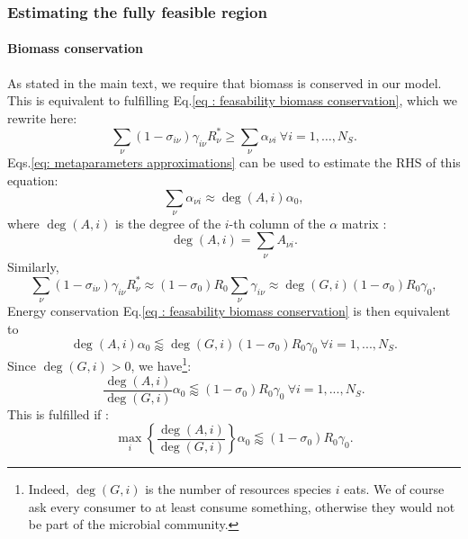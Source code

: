 \documentclass[12pt, titlepage, twoside, openright]{report}
\begin{document}
\subsubsection{Estimating the fully feasible region}\label{sec : estimating fully feasible region metaparameters}
\paragraph{Biomass conservation}
As stated in the main text, we require that biomass is conserved in our model. This is equivalent to fulfilling Eq.\eqref{eq : feasability biomass conservation}, which we rewrite here:
\begin{equation}
\sum_\nu \left(1-\sigma_{i\nu}\right)\gamma_{i\nu}R^*_\nu \geq \sum_\nu \alpha_{\nu i} \ \forall i=1,\dots, N_S.
\end{equation}
Eqs.\eqref{eq: metaparameters approximations} can be used to estimate the RHS of this equation:
\begin{equation}
\sum_\nu \alpha_{\nu i} \approx \deg(A, i) \alpha_0,
\end{equation}
where $\deg(A,i)$ is the degree of the $i$-th column of the $\alpha$ matrix :
\begin{equation}
\deg(A, i) = \sum_\nu A_{\nu i}.
\end{equation}
Similarly,
\begin{equation}
\sum_\nu \left(1-\sigma_{i\nu}\right)\gamma_{i\nu} R^*_\nu \approx (1-\sigma_0)R_0\sum_{\nu}\gamma_{i\nu} \approx \deg(G, i)(1-\sigma_0)R_0\gamma_0,
\end{equation}
Energy conservation Eq.\eqref{eq : feasability biomass conservation} is then equivalent to
\begin{equation}
\deg(A,i) \alpha_0 \lessapprox \deg(G,i) (1-\sigma_0)R_0\gamma_0 \ \forall i=1,...,N_S.
\end{equation}
Since $\deg(G,i) > 0 $, we have\footnote{Indeed, $\deg(G,i)$ is the number of resources species $i$ eats. We of course ask every consumer to at least consume something, otherwise they would not be part of the microbial community.}:
\begin{equation}
\frac{\deg(A,i)}{\deg(G,i)} \alpha_0 \lessapprox (1-\sigma_0)R_0\gamma_0 \ \forall i=1,...,N_S.
\end{equation}
This is fulfilled if :
\begin{equation}\label{eq: feasability energy conservation}
{
\max_i\left\{\frac{\deg(A,i)}{\deg(G,i)}\right\} \alpha_0 \lessapprox (1-\sigma_0)R_0 \gamma_0
}.
\end{equation}
\end{document}

